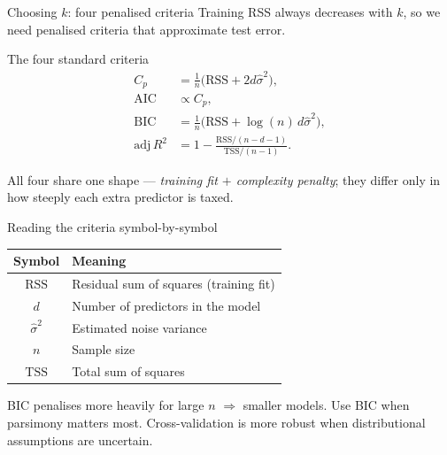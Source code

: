 \documentclass[aspectratio=169,11pt]{beamer}
\begin{document}
\begin{frame}{Choosing $k$: four penalised criteria}
  Training RSS always decreases with $k$, so we need penalised
  criteria that approximate test error.
  \begin{block}{The four standard criteria}
    \begin{align*}
      C_p &= \tfrac{1}{n}\bigl(\mathrm{RSS} + 2 d \hat\sigma^2\bigr), \\
      \mathrm{AIC} &\propto C_p, \\
      \mathrm{BIC} &= \tfrac{1}{n}\bigl(\mathrm{RSS} + \log(n)\, d \hat\sigma^2\bigr), \\
      \mathrm{adj}\,R^2 &= 1 - \tfrac{\mathrm{RSS}/(n - d - 1)}{\mathrm{TSS}/(n-1)}.
    \end{align*}
  \end{block}
  \begin{takeaway}
    All four share one shape --- \emph{training fit $+$ complexity
    penalty}; they differ only in how steeply each extra predictor is
    taxed.
  \end{takeaway}
\end{frame}

\begin{frame}{Reading the criteria symbol-by-symbol}
  \begin{readme}
    \begin{tabular}{@{}cl@{}}
      \toprule
      \textbf{Symbol} & \textbf{Meaning} \\
      \midrule
      $\mathrm{RSS}$ & Residual sum of squares (training fit) \\
      $d$ & Number of predictors in the model \\
      $\hat\sigma^2$ & Estimated noise variance \\
      $n$ & Sample size \\
      $\mathrm{TSS}$ & Total sum of squares \\
      \bottomrule
    \end{tabular}
  \end{readme}
  \begin{takeaway}
    BIC penalises more heavily for large $n$ $\Rightarrow$ smaller
    models. Use BIC when parsimony matters most. Cross-validation is
    more robust when distributional assumptions are uncertain.
  \end{takeaway}
\end{frame}
\end{document}
